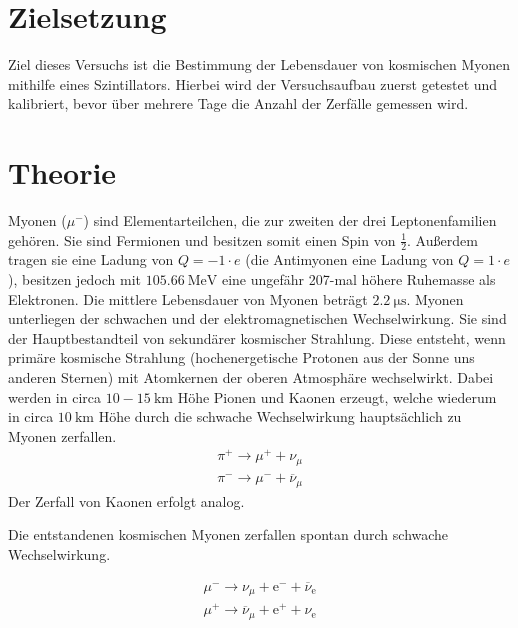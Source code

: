 \section{Zielsetzung}
\label{sec:Zielsetzung}
Ziel dieses Versuchs ist die Bestimmung der Lebensdauer von kosmischen Myonen mithilfe eines Szintillators.
Hierbei wird der Versuchsaufbau zuerst getestet und kalibriert, bevor über mehrere Tage die Anzahl der Zerfälle gemessen wird.


\section{Theorie}
\label{sec:Theorie}

Myonen ($\mu^-$) sind Elementarteilchen, die zur zweiten der drei Leptonenfamilien gehören.
Sie sind Fermionen und besitzen somit einen Spin von $\frac{1}{2}$.
Außerdem tragen sie eine Ladung von $Q=\num{-1}\cdot e$ (die Antimyonen eine Ladung von $Q=\num{1}\cdot e$ ), besitzen jedoch mit $\qty{105.66}{\mega\electronvolt}$
eine ungefähr 207-mal höhere Ruhemasse als Elektronen.
Die mittlere Lebensdauer von Myonen beträgt $\qty{2.2}{\micro\second}$. \cite{PDG}
Myonen unterliegen der schwachen und der elektromagnetischen Wechselwirkung.
Sie sind der Hauptbestandteil von sekundärer kosmischer Strahlung.
Diese entsteht, wenn primäre kosmische Strahlung (hochenergetische Protonen aus der Sonne uns anderen Sternen) mit Atomkernen
der oberen Atmosphäre wechselwirkt. Dabei werden in circa $10-\qty{15}{\kilo\meter}$ Höhe Pionen und Kaonen erzeugt,
welche wiederum in circa $\qty{10}{\kilo\meter}$ Höhe durch die schwache Wechselwirkung hauptsächlich zu Myonen zerfallen.
\begin{align*}
    \pi^+ \longrightarrow \mu^+ + \nu_{\mu} \\
    \pi^- \longrightarrow \mu^- + \overline{\nu}_{\mu}
\end{align*}
Der Zerfall von Kaonen erfolgt analog.

Die entstandenen kosmischen Myonen zerfallen spontan durch schwache Wechselwirkung.

\begin{align*}
    \mu^- \longrightarrow \nu_{\mu} + \text{e}^- + \overline{\nu}_{\text{e}} \\
    \mu^+ \longrightarrow \overline{\nu}_{\mu} + \text{e}^+ + \nu_{\text{e}} 
\end{align*}
\\

